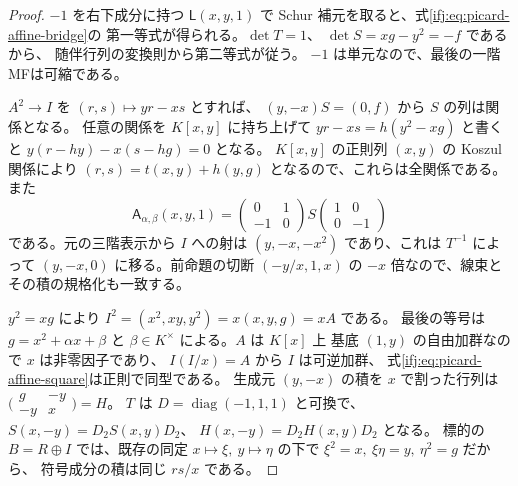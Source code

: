 \begin{proof}
$-1$ を右下成分に持つ $\mathsf L(x,y,1)$ で
Schur 補元を取ると、式\eqref{ifj:eq:picard-affine-bridge}の
第一等式が得られる。$\det T=1$、
$\det S=xg-y^2=-f$ であるから、
随伴行列の変換則から第二等式が従う。
$-1$ は単元なので、最後の一階MFは可縮である。

$A^2\to I$ を $(r,s)\mapsto yr-xs$ とすれば、
$(y,-x)S=(0,f)$ から $S$ の列は関係となる。
任意の関係を $K[x,y]$ に持ち上げて
$yr-xs=h(y^2-xg)$ と書くと
$y(r-hy)-x(s-hg)=0$ となる。
$K[x,y]$ の正則列 $(x,y)$ の Koszul 関係により
$(r,s)=t(x,y)+h(y,g)$ となるので、これらは全関係である。
また
\[
 \mathsf A_{\alpha,\beta}(x,y,1)
 =\begin{pmatrix}0&1\\-1&0\end{pmatrix}
 S\begin{pmatrix}1&0\\0&-1\end{pmatrix}
\]
である。元の三階表示から $I$ への射は
$(y,-x,-x^2)$ であり、これは $T^{-1}$ によって
$(y,-x,0)$ に移る。前命題の切断
$(-y/x,1,x)$ の $-x$ 倍なので、線束とその積の規格化も一致する。

$y^2=xg$ により
$I^2=(x^2,xy,y^2)=x(x,y,g)=xA$ である。
最後の等号は $g=x^2+\alpha x+\beta$ と
$\beta\in K^\times$ による。$A$ は $K[x]$ 上
基底 $(1,y)$ の自由加群なので $x$ は非零因子であり、
$I(I/x)=A$ から $I$ は可逆加群、
式\eqref{ifj:eq:picard-affine-square}は正則で同型である。
生成元 $(y,-x)$ の積を $x$ で割った行列は
$\bigl(\begin{smallmatrix}g&-y\\-y&x\end{smallmatrix}\bigr)=H$。
$T$ は $D=\operatorname{diag}(-1,1,1)$ と可換で、
$S(x,-y)=D_2S(x,y)D_2$、
$H(x,-y)=D_2H(x,y)D_2$ となる。
標的の $B=R\oplus I$ では、既存の同定
$x\mapsto\xi,\ y\mapsto\eta$ の下で
$\xi^2=x,\ \xi\eta=y,\ \eta^2=g$ だから、
符号成分の積は同じ $rs/x$ である。
\end{proof}


